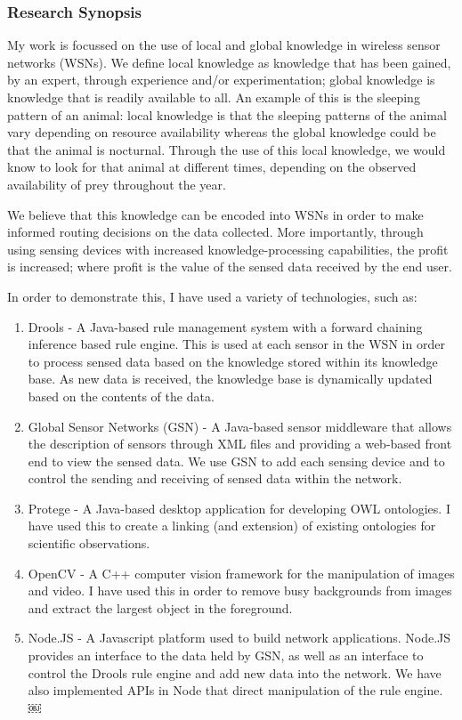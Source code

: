 \documentclass[11pt,fullpage]{article}
\begin{document}
\subsubsection*{Research Synopsis}
My work is focussed on the use of local and global knowledge in wireless sensor networks (WSNs). We define local knowledge as knowledge that has been gained, by an expert, through experience and/or experimentation; global knowledge is knowledge that is readily available to all. An example of this is the sleeping pattern of an animal: local knowledge is that the sleeping patterns of the animal vary depending on resource availability whereas the global knowledge could be that the animal is nocturnal. Through the use of this local knowledge, we would know to look for that animal at different times, depending on the observed availability of prey throughout the year.

We believe that this knowledge can be encoded into WSNs in order to make informed routing decisions on the data collected. More importantly, through using sensing devices with increased knowledge-processing capabilities, the profit is increased; where profit is the value of the sensed data received by the end user.

In order to demonstrate this, I have used a variety of technologies, such as:
\begin{enumerate}
	\item Drools - A Java-based rule management system with a forward chaining inference based rule engine. This is used at each sensor in the WSN in order to process sensed data based on the knowledge stored within its knowledge base. As new data is received, the knowledge base is dynamically updated based on the contents of the data.
	\item Global Sensor Networks (GSN) - A Java-based sensor middleware that allows the description of sensors through XML files and providing a web-based front end to view the sensed data. We use GSN to add each sensing device and to control the sending and receiving of sensed data within the network.
	\item Protege - A Java-based desktop application for developing OWL ontologies. I have used this to create a linking (and extension) of existing ontologies for scientific observations.
	\item OpenCV - A C++ computer vision framework for the manipulation of images and video. I have used this in order to remove busy backgrounds from images and extract the largest object in the foreground.
	\item Node.JS - A Javascript platform used to build network applications. Node.JS provides an interface to the data held by GSN, as well as an interface to control the Drools rule engine and add new data into the network. We have also implemented APIs in Node that direct manipulation of the rule engine.
￼\end{enumerate}
	
\end{document}
